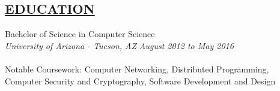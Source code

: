 \documentclass[10pt]{res} %
\begin{document}
\begin{resume}
\section{\underline{EDUCATION}}
\vspace{4pt}
    Bachelor of Science in Computer Science \\
    {\sl University of Arizona - Tucson, AZ} \hfill    {\sl August 2012 to May 2016}\\
    \\
    Notable Coursework: Computer Networking, Distributed Programming, Computer Security and Cryptography, Software Development and Design
  	
\end{resume}
\end{document}
